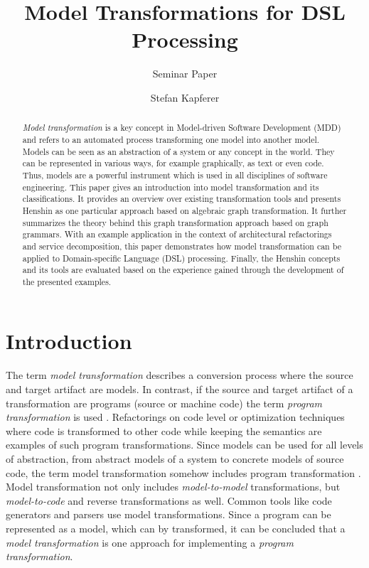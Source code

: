 \documentclass[runningheads]{llncs}
\begin{document}
\title{Model Transformations for DSL Processing}
\subtitle{Seminar Paper}
\author{Stefan Kapferer}
%
\maketitle
%
\begin{abstract}
\textit{Model transformation} is a key concept in Model-driven Software Development (MDD) and refers to an automated process transforming one model into another model. Models can be seen as an abstraction of a system or any concept in the world. They can be represented in various ways, for example graphically, as text or even code. Thus, models are a powerful instrument which is used in all disciplines of software engineering. This paper gives an introduction into model transformation and its classifications. It provides an overview over existing transformation tools and presents Henshin \cite{Arendt:2010:HAC:1926458.1926471} as one particular approach based on algebraic graph transformation. It further summarizes the theory behind this graph transformation approach based on graph grammars. With an example application in the context of architectural refactorings and service decomposition, this paper demonstrates how model transformation can be applied to Domain-specific Language (DSL) processing. Finally, the Henshin concepts and its tools are evaluated based on the experience gained through the development of the presented examples.

\end{abstract}
%
%
%
\section{Introduction}
The term \textit{model transformation} describes a conversion process where the source and target artifact are models. In contrast, if the source and target artifact of a transformation are programs (source or machine code) the term \textit{program transformation} is used \cite{MENS2006125}. Refactorings on code level or optimization techniques where code is transformed to other code while keeping the semantics are examples of such program transformations. Since models can be used for all levels of abstraction, from abstract models of a system to concrete models of source code, the term model transformation somehow includes program transformation \cite{MENS2006125}. Model transformation not only includes \textit{model-to-model} transformations, but \textit{model-to-code} and reverse transformations as well. Common tools like code generators and parsers use model transformations. Since a program can be represented as a model, which can by transformed, it can be concluded that a \textit{model transformation} is one approach for implementing a \textit{program transformation}.
\end{document}
